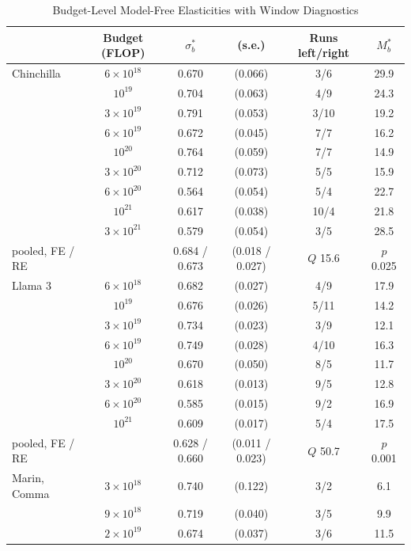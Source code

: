 \begin{table}[tp]
\centering
\caption{Budget-Level Model-Free Elasticities with Window Diagnostics}
\label{tab:sigmaC-budgets}
\footnotesize
\setlength{\tabcolsep}{2pt}
\begin{tabular*}{\textwidth}{@{\extracolsep{\fill}}>{\raggedright\arraybackslash}p{}ccccc@{}}
\toprule
 & Budget (FLOP) & $\sigma^*_b$ & (s.e.) & Runs left/right & $M^*_b$ \\
\midrule
Chinchilla & $6\times10^{18}$ & 0.670 & (0.066) & 3/6 & 29.9 \\
 & $10^{19}$ & 0.704 & (0.063) & 4/9 & 24.3 \\
 & $3\times10^{19}$ & 0.791 & (0.053) & 3/10 & 19.2 \\
 & $6\times10^{19}$ & 0.672 & (0.045) & 7/7 & 16.2 \\
 & $10^{20}$ & 0.764 & (0.059) & 7/7 & 14.9 \\
 & $3\times10^{20}$ & 0.712 & (0.073) & 5/5 & 15.9 \\
 & $6\times10^{20}$ & 0.564 & (0.054) & 5/4 & 22.7 \\
 & $10^{21}$ & 0.617 & (0.038) & 10/4 & 21.8 \\
 & $3\times10^{21}$ & 0.579 & (0.054) & 3/5 & 28.5 \\
\quad pooled, FE / RE & & 0.684 / 0.673 & (0.018 / 0.027) & $Q$ 15.6 & $p$ 0.025 \\
\addlinespace
Llama 3 & $6\times10^{18}$ & 0.682 & (0.027) & 4/9 & 17.9 \\
 & $10^{19}$ & 0.676 & (0.026) & 5/11 & 14.2 \\
 & $3\times10^{19}$ & 0.734 & (0.023) & 3/9 & 12.1 \\
 & $6\times10^{19}$ & 0.749 & (0.028) & 4/10 & 16.3 \\
 & $10^{20}$ & 0.670 & (0.050) & 8/5 & 11.7 \\
 & $3\times10^{20}$ & 0.618 & (0.013) & 9/5 & 12.8 \\
 & $6\times10^{20}$ & 0.585 & (0.015) & 9/2 & 16.9 \\
 & $10^{21}$ & 0.609 & (0.017) & 5/4 & 17.5 \\
\quad pooled, FE / RE & & 0.628 / 0.660 & (0.011 / 0.023) & $Q$ 50.7 & $p$ 0.001 \\
\addlinespace
Marin, Comma & $3\times10^{18}$ & 0.740 & (0.122) & 3/2 & 6.1 \\
 & $9\times10^{18}$ & 0.719 & (0.040) & 3/5 & 9.9 \\
 & $2\times10^{19}$ & 0.674 & (0.037) & 3/6 & 11.5 \\

\end{tabular*}
\end{table}
